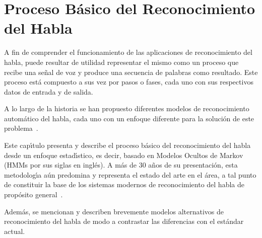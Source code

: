 \chapter{Proceso B\'{a}sico del Reconocimiento del Habla}
\label{sec:proceso}

A fin de comprender el funcionamiento de las aplicaciones de reconocimiento del habla, puede resultar de utilidad
representar el mismo como un proceso que recibe una se\~nal de voz y produce una secuencia de palabras como
resultado. Este proceso est\'a compuesto a sus vez por pasos o fases, cada uno con sus respectivos datos de entrada y 
de salida.

A lo largo de la historia se han propuesto diferentes modelos de reconocimiento autom\'atico del habla, cada uno
con un enfoque diferente para la soluci\'on de este \mbox{problema \cite{VimalaReview2012}}. 

Este cap{\'\i}tulo presenta y describe el proceso b\'asico del reconocimiento del habla desde un enfoque estad{\'\i}stico,
es decir, basado en Modelos Ocultos de Markov (HMMs por sus siglas en ingl\'es). A m\'as de 30 a\~nos de su presentaci\'on,
esta metodolog{\'\i}a a\'un predomina y representa el estado del arte en el \'area, a tal punto de constituir la base de
los sistemas modernos de reconocimiento del habla de prop\'osito \mbox{general \cite{BakerResearch2009, VimalaReview2012}}.

Adem\'as, se mencionan y describen brevemente modelos alternativos de reconocimiento del habla de modo a contrastar
las diferencias con el est\'andar actual.



